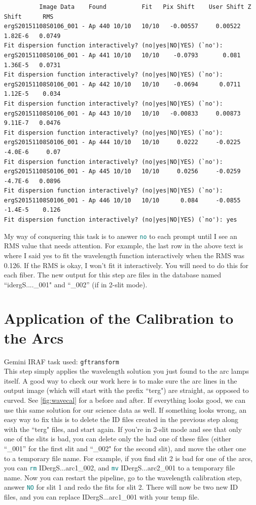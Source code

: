 \documentclass[12pt]{report}
\newcommand{\ty}[1]{\textcolor{teal}{\texttt{#1}}}
\begin{document}
\begin{verbatim}
          Image Data    Found          Fit   Pix Shift    User Shift Z Shift      RMS
ergS20151108S0106_001 - Ap 440 10/10   10/10   -0.00557     0.00522  1.82E-6   0.0749
Fit dispersion function interactively? (no|yes|NO|YES) (`no'): 
ergS20151108S0106_001 - Ap 441 10/10   10/10    -0.0793       0.081  1.36E-5   0.0731
Fit dispersion function interactively? (no|yes|NO|YES) (`no'): 
ergS20151108S0106_001 - Ap 442 10/10   10/10    -0.0694      0.0711  1.12E-5    0.034
Fit dispersion function interactively? (no|yes|NO|YES) (`no'): 
ergS20151108S0106_001 - Ap 443 10/10   10/10   -0.00833     0.00873  9.11E-7   0.0476
Fit dispersion function interactively? (no|yes|NO|YES) (`no'): 
ergS20151108S0106_001 - Ap 444 10/10   10/10     0.0222     -0.0225  -4.0E-6     0.07
Fit dispersion function interactively? (no|yes|NO|YES) (`no'): 
ergS20151108S0106_001 - Ap 445 10/10   10/10     0.0256     -0.0259  -4.7E-6   0.0896
Fit dispersion function interactively? (no|yes|NO|YES) (`no'): 
ergS20151108S0106_001 - Ap 446 10/10   10/10      0.084     -0.0855  -1.4E-5    0.126
Fit dispersion function interactively? (no|yes|NO|YES) (`no'): yes
\end{verbatim}

My way of conquering this task is to answer \ty{no} to each prompt until I see an RMS value that needs attention. For example, the last row in the above text is where I said yes to fit the wavelength function interactively when the RMS was 0.126. If the RMS is okay, I won't fit it interactively. You will need to do this for each fiber. The new output for this step are files in the database named ``idergS....\_001" and ``\_002'' (if in 2-slit mode).

\section{Application of the Calibration to the Arcs}

\noindent Gemini IRAF task used: \texttt{gftransform}\\

\noindent This step simply applies the wavelength solution you just found to the arc lamps itself. A good way to check our work here is to make sure the arc lines in the output image (which will start with the prefix ``terg") are straight, as opposed to curved. See \autoref{fig:wavecal} for a before and after. If everything looks good, we can use this same solution for our science data as well. If something looks wrong, an easy way to fix this is to delete the ID files created in the previous step along with the ``terg" files, and start again. If you're in 2-slit mode and see that only one of the slits is bad, you can delete only the bad one of these files (either ``\_001'' for the first slit and ``\_002" for the second slit), and move the other one to a temporary file name. For example, if you find slit 2 is bad for one of the arcs, you can \ty{rm} IDergS...arc1\_002, and \ty{mv} IDergS...arc2\_001 to a temporary file name. Now you can restart the pipeline, go to the wavelength calibration step, answer \ty{NO} for slit 1 and redo the fits for slit 2. There will now be two new ID files, and you can replace IDergS...arc1\_001 with your temp file.
\end{document}
